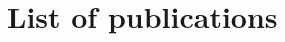 \documentclass[
	11pt, %
	fleqn, %
	b5paper,
]{LegrandOrangeBook}
\begin{document}










\pagestyle{empty} %

\tableofcontents %

\listoffigures %

\listoftables %

\pagestyle{fancy} %

\cleardoublepage %


\chapterimage{} %
\chapterspaceabove{6.75cm} %
\chapterspacebelow{7.25cm} %

\chapter*{List of publications}
\end{document}
